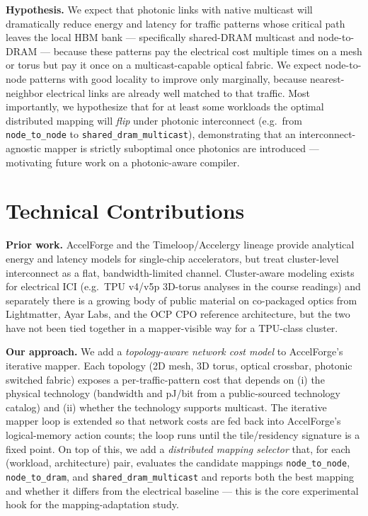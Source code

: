 \documentclass[conference,onecolumn]{IEEEtran}
\begin{document}
\textbf{Hypothesis.}
We expect that photonic links with native multicast will dramatically reduce
energy and latency for traffic patterns whose critical path leaves the local
HBM bank --- specifically shared-DRAM multicast and node-to-DRAM --- because
these patterns pay the electrical cost multiple times on a mesh or torus but
pay it once on a multicast-capable optical fabric. We expect node-to-node
patterns with good locality to improve only marginally, because nearest-neighbor
electrical links are already well matched to that traffic. Most importantly,
we hypothesize that for at least some workloads the optimal distributed
mapping will \emph{flip} under photonic interconnect (e.g.\ from
\texttt{node\_to\_node} to \texttt{shared\_dram\_multicast}), demonstrating
that an interconnect-agnostic mapper is strictly suboptimal once photonics are
introduced --- motivating future work on a photonic-aware compiler.


\section{Technical Contributions}
\textbf{Prior work.}
AccelForge and the Timeloop/Accelergy lineage provide analytical energy and
latency models for single-chip accelerators, but treat cluster-level
interconnect as a flat, bandwidth-limited channel. Cluster-aware modeling
exists for electrical ICI (e.g.\ TPU v4/v5p 3D-torus analyses in the course
readings) and separately there is a growing body of public material on
co-packaged optics from Lightmatter, Ayar Labs, and the OCP CPO reference
architecture, but the two have not been tied together in a mapper-visible way
for a TPU-class cluster.

\textbf{Our approach.}
We add a \emph{topology-aware network cost model} to AccelForge's iterative
mapper. Each topology (2D mesh, 3D torus, optical crossbar, photonic switched
fabric) exposes a per-traffic-pattern cost that depends on (i) the physical
technology (bandwidth and pJ/bit from a public-sourced technology catalog) and
(ii) whether the technology supports multicast. The iterative mapper loop is
extended so that network costs are fed back into AccelForge's logical-memory
action counts; the loop runs until the tile/residency signature is a fixed
point. On top of this, we add a \emph{distributed mapping selector} that, for
each (workload, architecture) pair, evaluates the candidate mappings
\texttt{node\_to\_node}, \texttt{node\_to\_dram}, and
\texttt{shared\_dram\_multicast} and reports both the best mapping and whether
it differs from the electrical baseline --- this is the core experimental
hook for the mapping-adaptation study.
\end{document}
